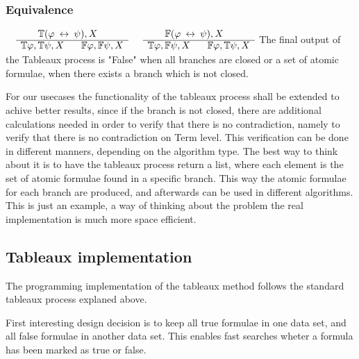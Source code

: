 \documentclass{article}
\begin{document}
		\subsubsection*{Equivalence}
			$\begin{array}{rl}
				& \:\:\:\:\:\:\:\: \mathbb{T}(\varphi \: \leftrightarrow \: \psi), X \\
			      \cline{2-2}
			      & \mathbb{T}\varphi, \mathbb{T}\psi, X \:\:\:\:\:\:\:\: \mathbb{F}\varphi, \mathbb{F}\psi, X
			\end{array}$
			\:\:\:\:\:\:\:\:\:\:
			$\begin{array}{rl}
				& \:\:\:\:\:\:\:\: \mathbb{F}(\varphi \: \leftrightarrow \: \psi), X \\
			      \cline{2-2}
			      & \mathbb{T}\varphi, \mathbb{F}\psi, X \:\:\:\:\:\:\:\: \mathbb{F}\varphi, \mathbb{T}\psi, X
			\end{array}$
		\newline
		\newline
		\newline
		The final output of the Tableaux process is "False" when all branches are closed or a set of atomic formulae, when there exists a branch which is not closed.
		\newline
	
		For our usecases the functionality of the tableaux process shall be extended to achive better results, since if the branch is not closed, there are 
		additional calculations needed in order to verify that there is no contradiction, namely to verify that there is no contradiction on Term level.
		This verification can be done in different manners, depending on the algorithm type. The best way to think about it is to have the tableaux process
		return a list, where each element is the set of atomic formulae found in a specific branch. This way the atomic formulae for each branch are produced, and 
		afterwards can be used in different algorithms. This is just an example, a way of thinking about the problem the real implementation is much more space 
		efficient.

	\subsection{Tableaux implementation}
		The programming implementation of the tableaux method follows the standard tableaux process explaned above.

		First interesting design decision is to keep all true formulae in one data set, and all false formulae in another data set.
		This enables fast searches wheter a formula has been marked as true or false.
		
\end{document}
